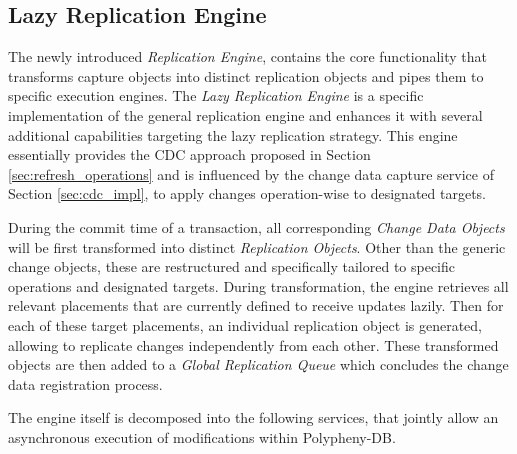 
\subsection{Lazy Replication Engine}
\label{sec:lazy:_engine}

The newly introduced \emph{Replication Engine}, contains the core functionality that transforms capture objects into distinct replication objects and 
pipes them to specific execution engines.
The \emph{Lazy Replication Engine} is a specific implementation of the general replication engine and enhances it with several additional capabilities targeting
the lazy replication strategy. This engine essentially provides the CDC approach proposed in Section \ref{sec:refresh_operations} and is influenced by the 
change data capture service of Section \ref{sec:cdc_impl}, to apply changes operation-wise to designated targets.

During the commit time of a transaction, all corresponding \emph{Change Data Objects} will be first transformed into distinct \emph{Replication Objects}. Other than
the generic change objects, these are restructured and specifically tailored to specific operations and designated targets. During transformation, the engine retrieves all 
relevant placements that are currently defined to receive updates lazily. Then for each of these target placements, an individual replication object is generated, allowing to 
replicate changes independently from each other. These transformed objects are then added to a \emph{Global Replication Queue} which concludes the change data registration process.


The engine itself is decomposed into the following services, that jointly allow an asynchronous execution of modifications within Polypheny-DB. 

